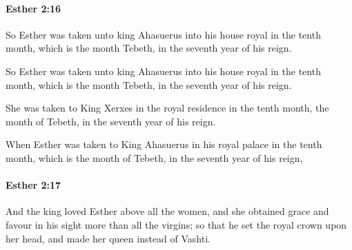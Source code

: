 		\paragraph{Esther 2:16} %
			\label{ESTHER-2-16}

			So Esther was taken unto king Ahasuerus into his house royal in the tenth month, which is the month Tebeth, in the seventh year of his reign.

			\begin{versebox}
					\item[BHS] 
					\item[LXX] 
					\item[ASV] So Esther was taken unto king Ahasuerus into his house royal in the tenth month, which is the month Tebeth, in the seventh year of his reign.
					\item[NIV] She was taken to King Xerxes in the royal residence in the tenth month, the month of Tebeth, in the seventh year of his reign.
					\item[NRSV] When Esther was taken to King Ahasuerus in his royal palace in the tenth month, which is the month of Tebeth, in the seventh year of his reign,
			\end{versebox}

		\paragraph{Esther 2:17} %
			\label{ESTHER-2-17}

			And the king loved Esther above all the women, and she obtained grace and favour in his sight more than all the virgins; so that he set the royal crown upon her head, and made her queen instead of Vashti.

